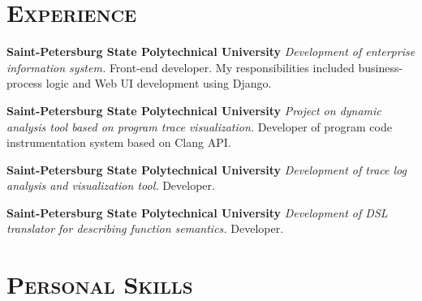 \documentclass[12pt,a4paper]{moderncv}
\begin{document}
\section{\textsc{Experience}}
%
%

{\textbf{Saint-Petersburg State Polytechnical University}\newline
 \textit{Development of enterprise information system.}\newline
         Front-end developer. My responsibilities included business-process logic and Web UI
         development using Django.}

{\textbf{Saint-Petersburg State Polytechnical University}\newline
 \textit{Project on dynamic analysis tool based on program trace visualization.}
 \newline Developer of program code instrumentation system based on Clang API.}

{\textbf{Saint-Petersburg State Polytechnical University}\newline
 \textit{Development of trace log analysis and visualization tool.}
 \newline Developer.}

{\textbf{Saint-Petersburg State Polytechnical University}\newline
 \textit{Development of DSL translator for describing function semantics.}
 \newline Developer.}


\section{\textsc{Personal Skills}}
%
%
%
%
%
\end{document}
